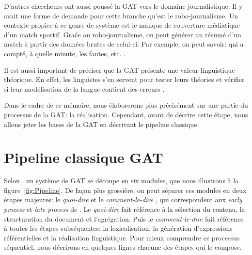 D'autres chercheurs ont aussi poussé la \ac{GAT} vers le domaine journalistique. Il y avait une forme de demande pour cette branche qu'est le robo-journalisme. Un contexte propice à ce genre de système est le manque de couverture médiatique d'un match sportif. Graĉe au robo-journalisme, on peut générer un résumé d'un match à partir des données brutes de celui-ci. Par exemple, on peut savoir: qui a compté, à quelle minute, les fautes, etc. \citep{W17-3513}.

Il est aussi important de préciser que la \ac{GAT} présente une valeur linguistique théorique. En effet, les linguistes s'en servent pour tester leurs théories et vérifier si leur modélisation de la langue contient des erreurs \citep{DanlosPresentationmodelegeneration1983}. 

Dans le cadre de ce mémoire, nous élaborerons plus précisément sur une partie du processus de la \ac{GAT}: la réalisation. Cependant, avant de décrire cette étape, nous allons jeter les bases de la \ac{GAT} en décrivant le pipeline classique.


\section{Pipeline classique GAT} \label{ppc}

Selon \cite{ReiterBuildingNaturalLanguage2000}, un système de \ac{GAT} se découpe en six modules, que nous illustrons à la figure~\ref{fig:Pipeline}. De façon plus grossière, on peut séparer ces modules en deux étapes majeures: le \emph{quoi-dire} et le \emph{comment-le-dire} \citep{DanlosPresentationmodelegeneration1983}, qui correspondent aux \emph{early process} et \emph{late process} de \cite{gatt18}. Le \emph{quoi-dire} fait référence à la sélection du contenu, la structuration du document et l'agrégation. Puis le \emph{comment-le-dire} fait référence à toutes les étapes subséquentes: la lexicalisation, la génération d'expressions référentielles et la réalisation linguistique. Pour mieux comprendre ce processus séquentiel, nous décrirons en quelques lignes chacune des étapes qui le compose.

